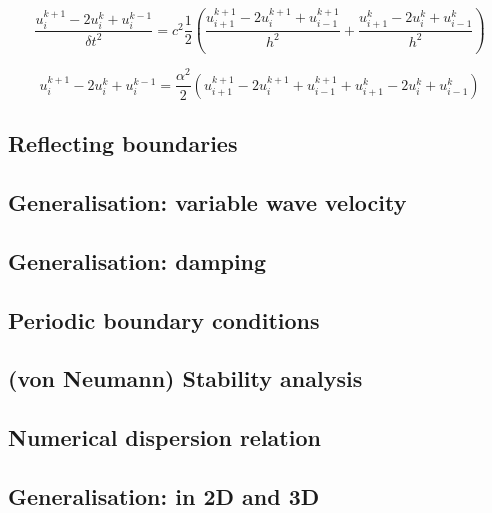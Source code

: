 \[
\frac{ u_i^{k+1} -2u_i^{k} +u_i^{k-1}  }{\delta\! t^2} = 
c^2 \frac12 \left(
\frac{ u_{i+1}^{k+1} -2u_{i}^{k+1} +u_{i-1}^{k+1}  }{h^2} 
+
\frac{ u_{i+1}^k -2u_{i}^k +u_{i-1}^k  }{h^2} 
\right)
\]


\[
u_i^{k+1} -2u_i^{k} +u_i^{k-1} 
=
\frac{\alpha^2}{2} \left(
u_{i+1}^{k+1} -2u_{i}^{k+1} +u_{i-1}^{k+1} 
+
u_{i+1}^k -2u_{i}^k +u_{i-1}^k 
\right)
\]


\subsection{Reflecting boundaries}

\subsection{Generalisation: variable wave velocity}

\subsection{Generalisation: damping}

\subsection{Periodic boundary conditions}

\subsection{(von Neumann) Stability analysis}

\subsection{Numerical dispersion relation}

\subsection{Generalisation: in 2D and 3D}








